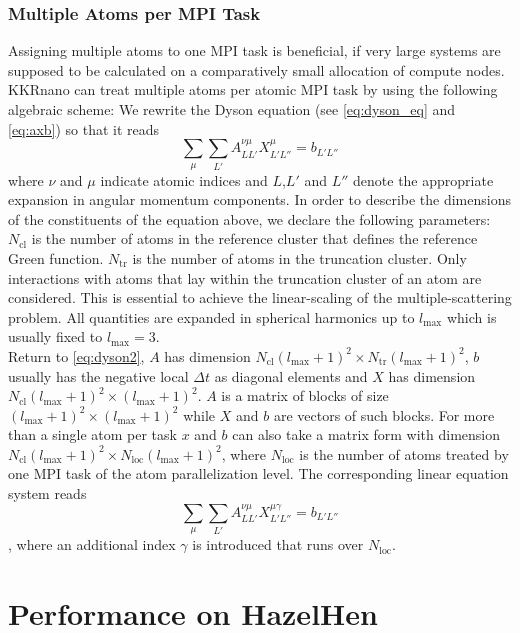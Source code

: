 \documentclass [a4paper, 12pt]{article}
\newcommand{\beq}{\begin{equation}}
\newcommand{\eeq}{\end{equation}}
\begin{document}
\subsubsection*{Multiple Atoms per MPI Task}

Assigning multiple atoms to one MPI task is beneficial, if very large systems are
supposed to be calculated on a comparatively small allocation of compute nodes.
\\
KKRnano can treat multiple atoms per atomic MPI task by using the following algebraic scheme: 
We rewrite the Dyson equation (see \cref{eq:dyson_eq} and \cref{eq:axb}) so that it reads
\beq
\sum_{\mu} \sum_{L'} A^{\nu \mu}_{LL'} X^{\mu}_{L'L''} = b_{L'L''}
\label{eq:dyson2}
\eeq
where $\nu$ and $\mu$ indicate atomic indices and $L$,$L'$ and $L''$ denote
the appropriate expansion in angular momentum components.
In order to describe the dimensions of the constituents of the equation above, we
declare the following parameters:
$N_{\text{cl}}$ is the number of atoms in the reference cluster that defines the reference Green function.
$N_{\text{tr}}$ is the number of atoms in the truncation cluster. Only interactions with atoms that lay 
within the truncation cluster of an atom are considered. This is essential to achieve
the linear-scaling of the multiple-scattering problem. 
All quantities are expanded in spherical harmonics up to $l_{\text{max}}$ which is usually fixed to
$l_{\text{max}}=3$.
\\
Return to \cref{eq:dyson2}, $A$ has dimension 
$N_{\text{cl}} (l_{\text{max}}+1)^2 \times N_{\text{tr}} (l_{\text{max}}+1)^2$,
$b$ usually has the
negative local $\Delta t$ as diagonal elements
and $X$ has dimension $N_{\text{cl}} (l_{\text{max}}+1)^2 \times (l_{\text{max}}+1)^2$.
$A$ is a matrix of blocks of size ${(l_{\text{max}}+1)}^2 \times {(l_{\text{max}}+1)}^2$
while $X$ and $b$ are vectors
of such blocks. For more than a single atom per task $x$ and $b$ can also take a matrix form
with dimension $N_{\text{cl}} (l_{\text{max}}+1)^2 \times N_{\text{loc}} (l_{\text{max}}+1)^2$, where
$N_{\text{loc}}$ is the number of atoms treated by one MPI task of the atom parallelization level.
The corresponding linear equation system reads
\beq
\label{eq:dyson_equation_lap_multi}
\sum_{\mu} \sum_{L'} A^{\nu \mu}_{LL'} X^{\mu \gamma}_{L'L''} = b_{L'L''}
\eeq
, where an additional index $\gamma$ is introduced that runs over $N_{\text{loc}}$. 

\section{Performance on HazelHen}
\end{document}

